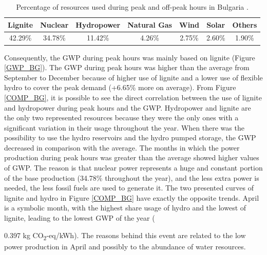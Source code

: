  
 \begin{table}[]
\centering
\caption{Percentage of resources used during peak and off-peak hours in Bulgaria  \cite{Entso-eProduction}.}
\label{RES_BG}
\begin{tabular}{ccccccc}
\toprule
\textbf{Lignite} &  \textbf{Nuclear} &  \textbf{Hydropower} & \textbf{Natural Gas} & \textbf{Wind} & \textbf{Solar} &  \textbf{Others} \\ \hline
42.29\% & 34.78\%  & 11.42\%  & 4.26\%             & 2.75\%  & 2.60\%    & 1.90\%          \\ \bottomrule
\end{tabular}
\end{table}
 
Consequently, the GWP during peak hours was mainly based on lignite (Figure \ref{GWP_BG}). The GWP during peak hours was higher than the average from September to December because of higher use of lignite and a lower use of flexible hydro to cover the peak demand {(+6.65\% more on average)}. From Figure  \ref{COMP_BG}, it is possible to see the direct correlation between the use of lignite and hydropower during peak hours and the GWP. Hydropower and lignite are the only two represented resources because they were the only ones with a significant variation in their usage throughout the year. When there was the possibility to use the hydro reservoirs and the hydro pumped storage, the GWP decreased in comparison with the average. The months in which the power production during peak hours was greater than the average showed higher values of GWP. The reason is that  nuclear power represents a huge and constant portion of the base production {(34.78\% throughout the year)}, and the less extra power is needed, the less fossil fuels are used to generate it. The two presented curves of lignite and hydro in Figure \ref{COMP_BG} have exactly the opposite trends. April is a symbolic month, with the highest share usage of hydro and the lowest of lignite,  leading to the lowest GWP of the year ({0.397 kg CO\textsubscript2-eq/kWh). The reasons behind this event are related to the low power production in April and possibly to the abundance of water resources. 
 
}
